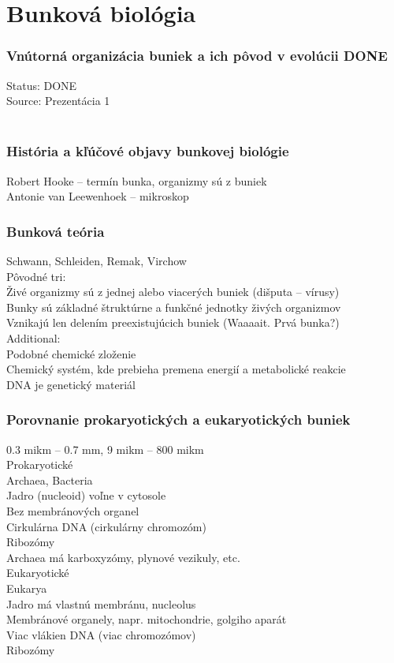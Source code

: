 \chapter[Bunková biológia]{Bunková biológia}
\label{bunkova_biologia} %

\subsection*{Vnútorná organizácia buniek a ich pôvod v evolúcii DONE}
Status: DONE\\
Source: Prezentácia 1\\
\\
\subsection*{História a kľúčové objavy bunkovej biológie}
Robert Hooke -- termín bunka, organizmy sú z buniek\\
Antonie van Leewenhoek -- mikroskop\\
\subsection*{Bunková teória}
Schwann, Schleiden, Remak, Virchow\\
Pôvodné tri:\\
\tab Živé organizmy sú z jednej alebo viacerých buniek (dišputa -- vírusy)\\
\tab Bunky sú základné štruktúrne a funkčné jednotky živých organizmov\\
\tab Vznikajú len delením preexistujúcich buniek (Waaaait. Prvá bunka?)\\
Additional: \\
\tab Podobné chemické zloženie\\
\tab Chemický systém, kde prebieha premena energií a metabolické reakcie\\
\tab DNA je genetický materiál\\
\subsection*{Porovnanie prokaryotických a eukaryotických buniek}
0.3 mikm -- 0.7 mm, 9 mikm -- 800 mikm\\
Prokaryotické\\
\tab Archaea, Bacteria\\
\tab Jadro (nucleoid) voľne v cytosole\\
\tab Bez membránových organel\\
\tab Cirkulárna DNA (cirkulárny chromozóm)\\
\tab Ribozómy\\
\tab Archaea má karboxyzómy, plynové vezikuly, etc.\\
Eukaryotické\\
\tab Eukarya\\
\tab Jadro má vlastnú membránu, nucleolus\\
\tab Membránové organely, napr. mitochondrie, golgiho aparát\\
\tab Viac vlákien DNA (viac chromozómov)\\
\tab Ribozómy\\
